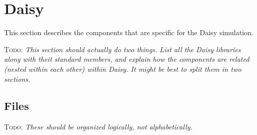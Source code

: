 \documentclass{article}
\newcommand{\todo}[1]{\textsc{Todo}: \textit{#1}}
\begin{document}
\section{Daisy}
\label{daisy}

This section describes the components that are specific for the Daisy
simulation.

\todo{This section should actually do two things.  List all the Daisy
  libraries along with theit standard members, and explain how the
  components are related (nested within each other) within Daisy.  It
  might be best to split them in two sections.}

\subsection{Files}

\todo{These should be organized logically, not alphabetically.}
\end{document}
